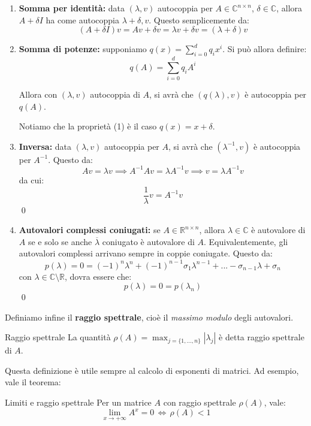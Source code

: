 \documentclass[a4paper,11pt]{article}
\begin{document}
\begin{enumerate}
	\item \textbf{Somma per identità:} data $(\lambda, v)$ autocoppia per $A \in \mathbb{C}^{n \times n}$, $\delta \in \mathbb{C}$, allora $A + \delta I$ ha come autocoppia $\lambda + \delta, v$.
		Questo semplicemente da:
		$$
			(A + \delta I) v = A v + \delta v = \lambda v + \delta v = (\lambda + \delta) v
		$$

	\item \textbf{Somma di potenze:} supponiamo $q(x) = \sum_{i = 0}^d q_i x^i$. Si può allora definire:
		$$
		q(A) = \sum_{i = 0}^d q_i A^i
		$$
		
		Allora con $(\lambda, v)$ autocoppia di $A$, si avrà che $(q(\lambda), v)$ è autocoppia per $q(A)$.

		Notiamo che la proprietà (1) è il caso $q(x) = x + \delta$.

	\item \textbf{Inversa:} data $(\lambda, v)$ autocoppia per $A$, si avrà che $(\lambda^{-1}, v)$ è autocoppia per $A^{-1}$.
		Questo da:
		$$
			A v = \lambda v \implies A^{-1} A v = \lambda A^{-1} v \implies v = \lambda A^{-1} v
		$$
		da cui:
		$$
		\frac{1}{\lambda} v = A^{-1} v
		$$ \qed

	\item \textbf{Autovalori complessi coniugati:} se $A \in \mathbb{R}^{n \times n}$, allora $\lambda \in \mathbb{C}$ è autovalore di $A$ se e solo se anche $\overline{\lambda}$ coniugato è autovalore di $A$.
		Equivalentemente, gli autovalori complessi arrivano sempre in coppie coniugate.
		Questo da:
		$$
		p(\lambda) = 0 = (-1)^n \lambda^n + (-1)^{n - 1} \sigma_1 \lambda^{n - 1} + ... - \sigma_{n - 1} \lambda + \sigma_{n}
		$$
		con $\lambda \in \mathbb{C} \setminus \mathbb{R}$, dovra essere che:
		$$
		p(\lambda) = 0 = p(\lambda_n)
		$$ \qed

\end{enumerate}

Definiamo infine il \textbf{raggio spettrale}, cioè il \textit{massimo modulo} degli autovalori.
\begin{definition}{Raggio spettrale}
	La quantità $\rho(A) = \max_{j = \{1,...,n\}} |\lambda_j|$ è detta raggio spettrale di $A$.
\end{definition}
Questa definizione è utile sempre al calcolo di esponenti di matrici.
Ad esempio, vale il teorema:
\begin{theorem}{Limiti e raggio spettrale}
	Per un matrice $A$ con raggio spettrale $\rho(A)$, vale:
	$$\lim_{x \rightarrow + \infty} A^x = 0 \, \Leftrightarrow \, \rho(A) < 1$$
\end{theorem}
\end{document}
